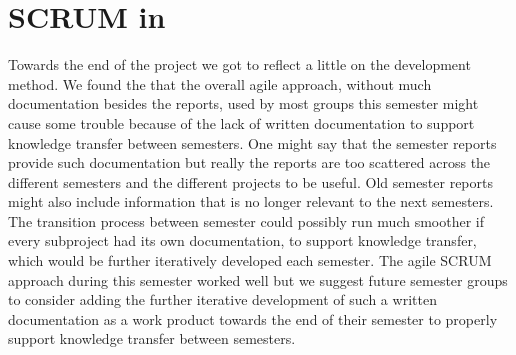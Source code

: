 
\section{SCRUM in \giraf}

Towards the end of the project we got to reflect a little on the \giraf development method. We found the that the overall agile approach, without much documentation besides the reports, used by most groups this semester might cause some trouble because of the lack of written documentation to support knowledge transfer between semesters. One might say that the semester reports provide such documentation but really the reports are too scattered across the different semesters and the different projects to be useful. Old semester reports might also include information that is no longer relevant to the next semesters. The transition process between semester could possibly run much smoother if every subproject had its own documentation, to support knowledge transfer, which would be further iteratively developed each semester. The agile SCRUM approach during this semester worked well but we suggest future semester groups to consider adding the further iterative development of such a written documentation as a work product towards the end of their semester to properly support knowledge transfer between semesters.